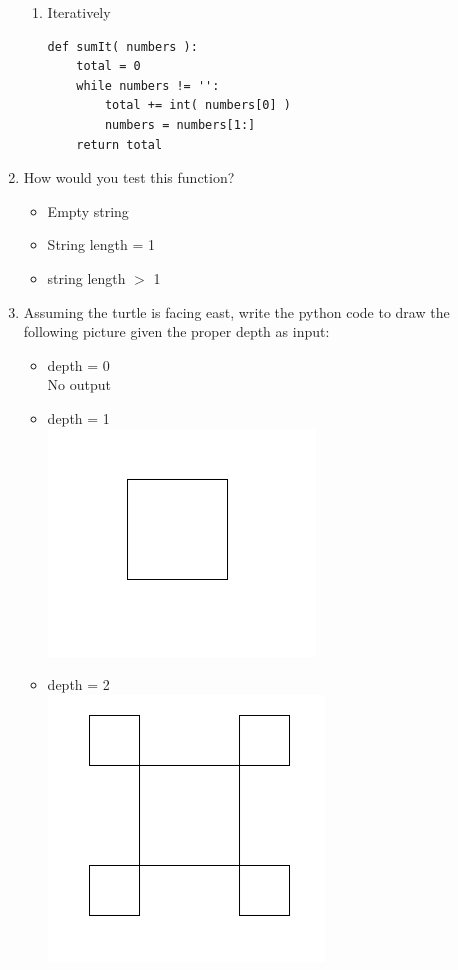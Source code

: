\documentclass[11pt]{article}
\newenvironment{answer}{\large\lstset{basicstyle=\large}\color{white}}{}
\newenvironment{answer}{\large\lstset{basicstyle=\large}\color{red}}{}
\begin{document}
\begin{enumerate}
\begin{enumerate}
            \item Iteratively
\begin{answer}
\begin{lstlisting}
def sumIt( numbers ):
    total = 0
    while numbers != '':
        total += int( numbers[0] )
        numbers = numbers[1:]
    return total
\end{lstlisting}
\end{answer}
\end{enumerate}
            \item How would you test this function?
                \begin{answer}
                \begin{itemize}
                    \item Empty string 
                    \item String length = 1
                    \item string length $>$ 1
                \end{itemize}
                \end{answer}
\pagebreak
\item Assuming the turtle is facing east, write the python code to draw the following picture given the proper depth as input:
    \begin{itemize}
            \item depth = 0
           \\No output 
            \item depth = 1\\
            \includegraphics[scale=0.4]{1.png}
            \item depth = 2 \\
            \includegraphics[scale=0.4]{2.png}

\end{itemize}
\end{enumerate}
\end{document}
